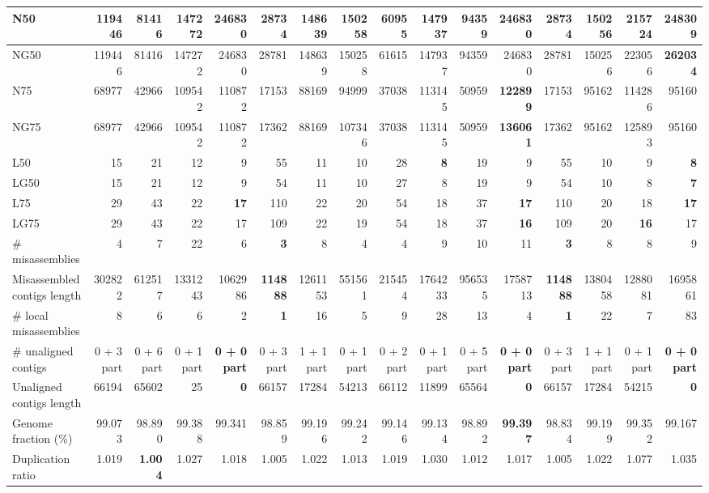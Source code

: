 \documentclass[12pt,a4paper]{article}
\begin{document}
\begin{table}[ht]
\begin{center}
\begin{tabular}{|l*{15}{|r}|}
N50 & 119446 & 81416 & 147272 & 246830 & 28734 & 148639 & 150258 & 60955 & 147937 & 94359 & 246830 & 28734 & 150256 & 215724 & {\bf 248309} \\ \hline
NG50 & 119446 & 81416 & 147272 & 246830 & 28781 & 148639 & 150258 & 61615 & 147937 & 94359 & 246830 & 28781 & 150256 & 223056 & {\bf 262034} \\ \hline
N75 & 68977 & 42966 & 109542 & 110872 & 17153 & 88169 & 94999 & 37038 & 113145 & 50959 & {\bf 122899} & 17153 & 95162 & 114286 & 95160 \\ \hline
NG75 & 68977 & 42966 & 109542 & 110872 & 17362 & 88169 & 107346 & 37038 & 113145 & 50959 & {\bf 136061} & 17362 & 95162 & 125893 & 95160 \\ \hline
L50 & 15 & 21 & 12 & 9 & 55 & 11 & 10 & 28 & {\bf 8} & 19 & 9 & 55 & 10 & 9 & {\bf 8} \\ \hline
LG50 & 15 & 21 & 12 & 9 & 54 & 11 & 10 & 27 & 8 & 19 & 9 & 54 & 10 & 8 & {\bf 7} \\ \hline
L75 & 29 & 43 & 22 & {\bf 17} & 110 & 22 & 20 & 54 & 18 & 37 & {\bf 17} & 110 & 20 & 18 & {\bf 17} \\ \hline
LG75 & 29 & 43 & 22 & 17 & 109 & 22 & 19 & 54 & 18 & 37 & {\bf 16} & 109 & 20 & {\bf 16} & 17 \\ \hline
\# misassemblies & 4 & 7 & 22 & 6 & {\bf 3} & 8 & 4 & 4 & 9 & 10 & 11 & {\bf 3} & 8 & 8 & 9 \\ \hline
Misassembled contigs length & 302822 & 612517 & 1331243 & 1062986 & {\bf 114888} & 1261153 & 551561 & 215454 & 1764233 & 956535 & 1758713 & {\bf 114888} & 1380458 & 1288081 & 1695861 \\ \hline
\# local misassemblies & 8 & 6 & 6 & 2 & {\bf 1} & 16 & 5 & 9 & 28 & 13 & 4 & {\bf 1} & 22 & 7 & 83 \\ \hline
\# unaligned contigs & 0 + 3 part & 0 + 6 part & 0 + 1 part & {\bf 0 + 0 part} & 0 + 3 part & 1 + 1 part & 0 + 1 part & 0 + 2 part & 0 + 1 part & 0 + 5 part & {\bf 0 + 0 part} & 0 + 3 part & 1 + 1 part & 0 + 1 part & {\bf 0 + 0 part} \\ \hline
Unaligned contigs length & 66194 & 65602 & 25 & {\bf 0} & 66157 & 17284 & 54213 & 66112 & 11899 & 65564 & {\bf 0} & 66157 & 17284 & 54215 & {\bf 0} \\ \hline
Genome fraction (\%) & 99.073 & 98.890 & 99.388 & 99.341 & 98.859 & 99.196 & 99.242 & 99.146 & 99.134 & 98.892 & {\bf 99.397} & 98.834 & 99.199 & 99.352 & 99.167 \\ \hline
Duplication ratio & 1.019 & {\bf 1.004} & 1.027 & 1.018 & 1.005 & 1.022 & 1.013 & 1.019 & 1.030 & 1.012 & 1.017 & 1.005 & 1.022 & 1.077 & 1.035 \\ \hline

\end{tabular}
\end{center}
\end{table}
\end{document}
